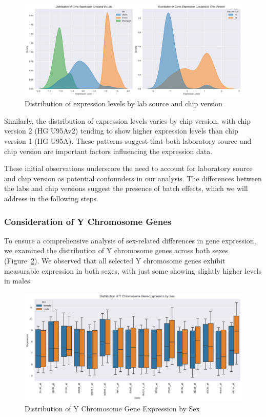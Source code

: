 \documentclass[12pt]{article}
\begin{document}
\begin{figure}[h!]
    \centering
    \includegraphics[width=.8\textwidth]{image/original_data}
    \caption{Distribution of expression levels by lab source and chip version}
    \label{fig:original_data}
\end{figure}
\FloatBarrier

Similarly, the distribution of expression levels varies by chip version, with chip version 2 (HG U95Av2) tending to show higher expression levels than chip version 1 (HG U95A). These patterns suggest that both laboratory source and chip version are important factors influencing the expression data.

These initial observations underscore the need to account for laboratory source and chip version as potential confounders in our analysis. The differences between the labs and chip versions suggest the presence of batch effects, which we will address in the following steps. 


\subsubsection{Consideration of Y Chromosome Genes}

To ensure a comprehensive analysis of sex-related differences in gene expression, we examined the distribution of Y chromosome genes across both sexes (Figure~\ref{fig:Y genes}). We observed that all selected Y chromosome genes exhibit measurable expression in both sexes, with just some showing slightly higher levels in males.

\begin{figure}[h!]
    \centering
    \includegraphics[width=.8\textwidth]{image/Y_gene_dist.png}
    \caption{Distribution of Y Chromosome Gene Expression by Sex}
    \label{fig:Y genes}
\end{figure}
\FloatBarrier
\end{document}
